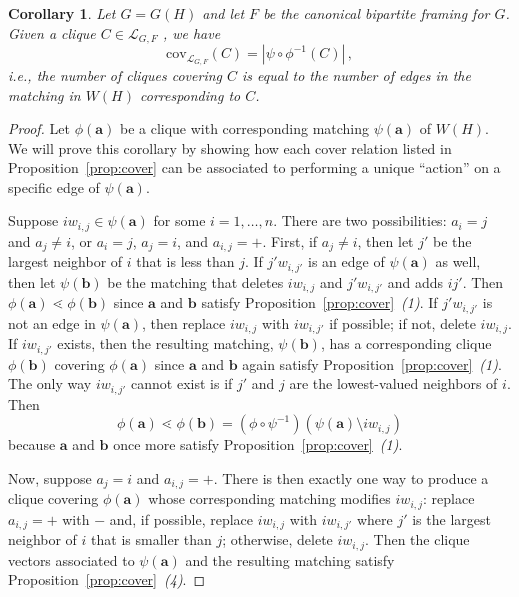 \documentclass[12pt]{amsart}
\newtheorem{corollary}[theorem]{Corollary}
\theoremstyle{definition}
\newcommand\ba{\mathbf{a}}
\newcommand\bb{\mathbf{b}}
\newcommand{\scrL}{\mathscr{L}}
\newcommand{\cov}{\mathrm{cov}}
\begin{document}
\begin{corollary}\label{cor:coverings of a clique}
    Let $G = G(H)$ and let $F$ be the canonical bipartite framing for $G$.
    Given a clique $C\in\scrL_{G,F}$ , we have 
    \[
    \cov_{\scrL_{G,F}}(C)=|\psi\circ\phi^{-1}(C)| \, ,
    \]
    i.e., the number of cliques covering $C$ is equal to the number of edges in the matching in $W(H)$ corresponding to $C$.
\end{corollary}

\begin{proof}
    Let $\phi(\ba)$ be a clique with corresponding matching $\psi(\ba)$ of $W(H)$.
    We will prove this corollary by showing how each cover relation listed in Proposition~\ref{prop:cover} can be associated to performing a unique ``action'' on a specific edge of $\psi(\ba)$. 
    
    Suppose $iw_{i,j} \in \psi(\ba)$ for some $i = 1,\dots,n$.
    There are two possibilities: $a_i = j$ and $a_j \neq i$, or $a_i = j$, $a_j = i$, and $a_{i,j} = +$.
    First, if $a_j \neq i$, then let $j'$ be the largest neighbor of $i$ that is less than $j$.
    If $j'w_{i,j'}$ is an edge of $\psi(\ba)$ as well, then let $\psi(\bb)$ be the matching that deletes $iw_{i,j}$ and $j'w_{i,j'}$ and adds $ij'$.
    Then $\phi(\ba) \lessdot \phi(\bb)$ since $\ba$ and $\bb$ satisfy Proposition~\ref{prop:cover}~\emph{(1)}. 
    If $j'w_{i,j'}$ is not an edge in $\psi(\ba)$, then replace $iw_{i,j}$ with $iw_{i,j'}$ if possible; if not, delete $iw_{i,j}$.
    If $iw_{i,j'}$ exists, then the resulting matching, $\psi(\bb)$, has a corresponding clique $\phi(\bb)$ covering $\phi(\ba)$ since $\ba$ and $\bb$ again satisfy Proposition~\ref{prop:cover}~\emph{(1)}.
    The only way $iw_{i,j'}$ cannot exist is if $j'$ and $j$ are the lowest-valued neighbors of $i$.
    Then 
    \[
        \phi(\ba) \lessdot \phi(\bb) = (\phi \circ \psi^{-1})(\psi(\ba) \setminus iw_{i,j})
    \]
    because $\ba$ and $\bb$ once more satisfy Proposition~\ref{prop:cover}~\emph{(1)}.

    Now, suppose $a_j = i$ and $a_{i,j} = +$.
    There is then exactly one way to produce a clique covering $\phi(\ba)$ whose corresponding matching modifies $iw_{i,j}$: replace $a_{i,j} = +$ with $-$ and, if possible, replace $iw_{i,j}$ with $iw_{i,j'}$ where $j'$ is the largest neighbor of $i$ that is smaller than $j$; otherwise, delete $iw_{i,j}$.
    Then the clique vectors associated to $\psi(\ba)$ and the resulting matching satisfy Proposition~\ref{prop:cover}~\emph{(4)}.


\end{proof}
\end{document}
